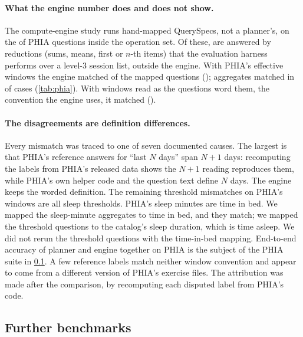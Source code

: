 \paragraph{What the engine number does and does not show.} The compute-engine study runs hand-mapped QuerySpecs, not
a planner's, on the \phiaMapped{} of \phiaTotal{} PHIA questions inside the operation set. Of these, \phiaSessions{}
are answered by reductions (sums, means, first or $n$-th items) that the evaluation harness performs over a level-3
session list, outside the engine. With PHIA's effective windows the engine matched \phiaMatchRef{} of the mapped
questions (\phiaAccRef{}); aggregates matched in \phiaAggregateRef{} of cases (\cref{tab:phia}). With windows read as
the questions word them, the convention the engine uses, it matched \phiaMatchWorded{} (\phiaAccWorded{}).

\paragraph{The disagreements are definition differences.} Every mismatch was traced to one of seven documented
causes. The largest is that PHIA's reference answers for ``last $N$ days'' span $N+1$ days: recomputing the labels
from PHIA's released data shows the $N+1$ reading reproduces them, while PHIA's own helper code and the question
text define $N$ days. The engine keeps the worded definition. The remaining threshold mismatches on PHIA's windows
are all sleep thresholds. PHIA's sleep minutes are time in bed. We mapped the sleep-minute aggregates to time in
bed, and they match; we mapped the threshold questions to the catalog's sleep duration, which is time asleep. We did not rerun the
threshold questions with the time-in-bed mapping. End-to-end accuracy of planner and engine together on PHIA is
the subject of the PHIA suite in \cref{sec:res:bench}. A few
reference labels match neither window convention and appear to come from a different version of PHIA's exercise
files. The attribution was made after the comparison, by recomputing each disputed label from PHIA's code.

\subsection{Further benchmarks}\label{sec:res:bench}

